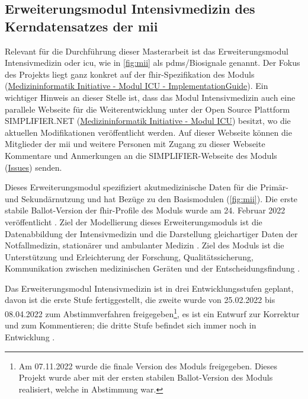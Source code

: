 \subsection{Erweiterungsmodul \glqq Intensivmedizin\grqq{} des Kerndatensatzes der \acs{mii}} \label{subsec:icumodul}

Relevant für die Durchführung dieser Masterarbeit ist das Erweiterungsmodul \glqq Intensivmedizin\grqq{} oder \ac{icu}, wie in \ref{fig:mii} als \acs{pdms}/Biosignale genannt. Der Fokus des Projekts liegt ganz konkret auf der \ac{fhir}-Spezifikation des Moduls (\href{https://www.medizininformatik-initiative.de/Kerndatensatz/Modul_Intensivmedizin/IGMIIKDSModulICU.html}{Medizininformatik Initiative - Modul ICU - ImplementationGuide}). Ein wichtiger Hinweis an dieser Stelle ist, dass das Modul \glqq Intensivmedizin\grqq{} auch eine parallele Webseite für die Weiterentwicklung unter der Open Source Plattform SIMPLIFIER.NET (\href{https://simplifier.net/medizininformatikinitiative-modul-intensivmedizin}{Medizininformatik Initiative - Modul ICU}) besitzt, wo die aktuellen Modifikationen veröffentlicht werden. Auf dieser Webseite können die Mitglieder der \ac{mii} und weitere Personen mit Zugang zu dieser Webseite Kommentare und Anmerkungen an die SIMPLIFIER-Webseite des Moduls (\href{https://simplifier.net/MedizininformatikInitiative-Modul-Intensivmedizin/~issues}{Issues}) senden.

Dieses Erweiterungsmodul spezifiziert akutmedizinische Daten für die Primär- und Sekundärnutzung und hat Bezüge zu den Basismodulen (\ref{fig:mii}). Die erste stabile Ballot-Version der \ac{fhir}-Profile des Moduls wurde am 24. Februar 2022 veröffentlicht \cite{modicu}. Ziel der Modellierung dieses Erweiterungsmoduls ist die Datenabbildung der Intensivmedizin und die Darstellung gleichartiger Daten der Notfallmedizin, stationärer und ambulanter Medizin \cite{icukdz}. Ziel des Moduls ist die Unterstützung und Erleichterung der Forschung, Qualitätssicherung, Kommunikation zwischen medizinischen Geräten und der Entscheidungsfindung \cite{modicuvid}.

Das Erweiterungsmodul \glqq Intensivmedizin\grqq{} ist in drei Entwicklungsstufen geplant, davon ist die erste Stufe fertiggestellt, die zweite wurde von 25.02.2022 bis 08.04.2022 zum Abstimmverfahren freigegeben\footnote{Am 07.11.2022 wurde die finale Version des Moduls freigegeben. Dieses Projekt wurde aber mit der ersten stabilen Ballot-Version des Moduls realisiert, welche in Abstimmung war.}, es ist ein Entwurf zur Korrektur und zum Kommentieren; die dritte Stufe befindet sich immer noch in Entwicklung \cite{modicuvid}.

